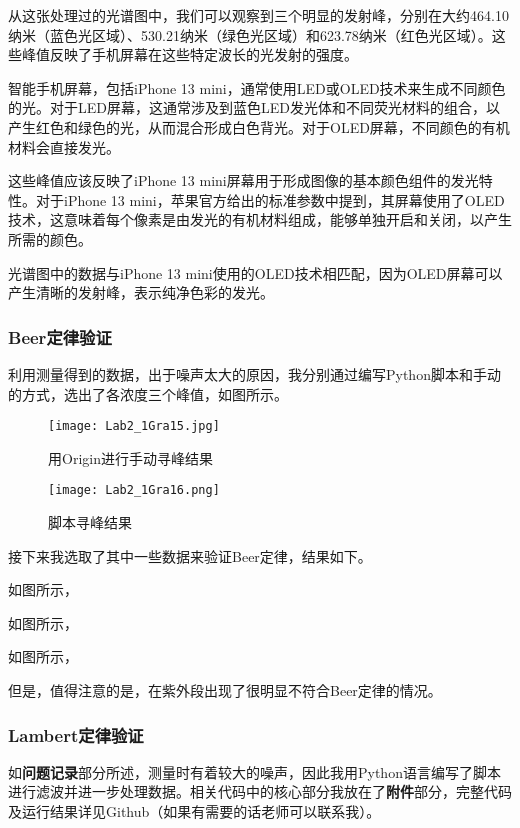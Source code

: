 \documentclass[dvipsnames, svgnames,a4paper,11pt]{article}
\begin{document}
\begin{enumerate}
		从这张处理过的光谱图中，我们可以观察到三个明显的发射峰，分别在大约464.10纳米（蓝色光区域）、530.21纳米（绿色光区域）和623.78纳米（红色光区域）。这些峰值反映了手机屏幕在这些特定波长的光发射的强度。
		
		智能手机屏幕，包括iPhone 13 mini，通常使用LED或OLED技术来生成不同颜色的光。对于LED屏幕，这通常涉及到蓝色LED发光体和不同荧光材料的组合，以产生红色和绿色的光，从而混合形成白色背光。对于OLED屏幕，不同颜色的有机材料会直接发光。
		
		这些峰值应该反映了iPhone 13 mini屏幕用于形成图像的基本颜色组件的发光特性。对于iPhone 13 mini，苹果官方给出的标准参数中提到，其屏幕使用了OLED技术，这意味着每个像素是由发光的有机材料组成，能够单独开启和关闭，以产生所需的颜色。
		
		光谱图中的数据与iPhone 13 mini使用的OLED技术相匹配，因为OLED屏幕可以产生清晰的发射峰，表示纯净色彩的发光。		
		
	\end{enumerate}
	
	\subsubsection{Beer定律验证}
	利用测量得到的数据，出于噪声太大的原因，我分别通过编写Python脚本和手动的方式，选出了各浓度三个峰值，如图所示。
	
	\begin{figure}[htbp]
		\centering
		\texttt{[image: Lab2\_1Gra15.jpg]}
		\caption{用Origin进行手动寻峰结果}
		\label{fig:fig15}
	\end{figure}
	
	\begin{figure}[htbp]
		\centering
		\texttt{[image: Lab2\_1Gra16.png]}
		\caption{脚本寻峰结果}
		\label{fig:fig16}
	\end{figure}
	
	接下来我选取了其中一些数据来验证Beer定律，结果如下。
	
	如图所示，
	
	如图所示，
	
	如图所示，
	
	但是，值得注意的是，在紫外段出现了很明显不符合Beer定律的情况。
	
	\subsubsection{Lambert定律验证}
	如\textbf{问题记录}部分所述，测量时有着较大的噪声，因此我用Python语言编写了脚本进行滤波并进一步处理数据。相关代码中的核心部分我放在了\textbf{附件}部分，完整代码及运行结果详见Github（如果有需要的话老师可以联系我）。
	
\end{document}
